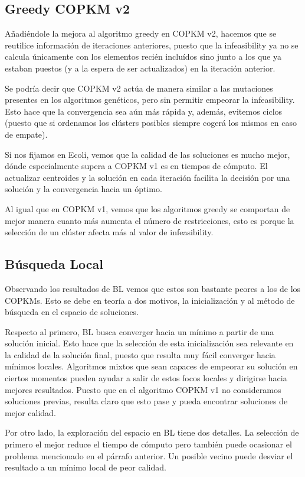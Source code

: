 \subsection{Greedy COPKM v2}

Añadiéndole la mejora al algoritmo greedy en COPKM v2, hacemos que se reutilice información de iteraciones anteriores, puesto que la infeasibility ya no se calcula únicamente con los elementos recién incluídos sino junto a los que ya estaban puestos (y a la espera de ser actualizados) en la iteración anterior.

Se podría decir que COPKM v2 actúa de manera similar a las mutaciones presentes en los algoritmos genéticos, pero sin permitir empeorar la infeasibility. Esto hace que la convergencia sea aún más rápida y, además, evitemos ciclos (puesto que si ordenamos los clústers posibles siempre cogerá los mismos en caso de empate).

Si nos fijamos en Ecoli, vemos que la calidad de las soluciones es mucho mejor, dónde especialmente supera a COPKM v1 es en tiempos de cómputo. El actualizar centroides y la solución en cada iteración facilita la decisión por una solución y la convergencia hacia un óptimo.

Al igual que en COPKM v1, vemos que los algoritmos greedy se comportan de mejor manera cuanto más aumenta el número de restricciones, esto es porque la selección de un clúster afecta más al valor de infeasibility. 

\subsection{Búsqueda Local}

Observando los resultados de BL vemos que estos son bastante peores a los de los COPKMs. Esto se debe en teoría a dos motivos, la inicialización y al método de búsqueda en el espacio de soluciones.

Respecto al primero, BL busca converger hacia un mínimo a partir de una solución inicial. Esto hace que la selección de esta inicialización sea relevante en la calidad de la solución final, puesto que resulta muy fácil converger hacia mínimos locales. Algoritmos mixtos que sean capaces de empeorar su solución en ciertos momentos pueden ayudar a salir de estos focos locales y dirigirse hacia mejores resultados. Puesto que en el algoritmo COPKM v1 no consideramos soluciones previas, resulta claro que esto pase y pueda encontrar soluciones de mejor calidad.

Por otro lado, la exploración del espacio en BL tiene dos detalles. La selección de primero el mejor reduce el tiempo de cómputo pero también puede ocasionar el problema mencionado en el párrafo anterior. Un posible vecino puede desviar el resultado a un mínimo local de peor calidad. 

